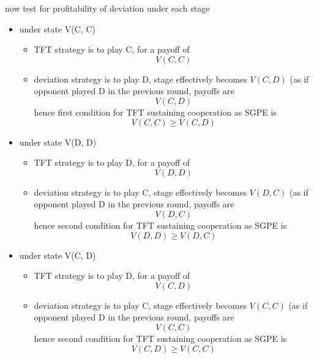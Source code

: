 \documentclass[a4paper, 10pt]{article}
\begin{document}
now test for profitability of deviation under each stage
\begin{itemize}
   \item under state V(C, C)
      \begin{itemize}
         \item TFT strategy is to play C, for a payoff of 
            \[
               V(C, C)
            \]
            
         \item deviation strategy is to play D, stage effectively becomes $V(C, D)$  (as if opponent played D in the previous round, payoffs are
            \[
               V(C, D)
            \]
         hence first condition for TFT sustaining cooperation as SGPE is 
         \begin{equation}
            V(C, C) \ge V(C, D)
         \end{equation}	
            
      \end{itemize}	

   \item under state V(D, D)
      \begin{itemize}
         \item TFT strategy is to play D, for a payoff of 
            \[
               V(D, D)
            \]
            
         \item deviation strategy is to play C, stage effectively becomes $V(D, C)$  (as if opponent played D in the previous round, payoffs are
            \[
               V(D, C)
            \]
         hence second condition for TFT sustaining cooperation as SGPE is 
         \begin{equation}
            V(D, D) \ge V(D, C)
         \end{equation}	
            
      \end{itemize}	

   \item under state V(C, D)
      \begin{itemize}
         \item TFT strategy is to play D, for a payoff of 
            \[
               V(C, D)
            \]
            
         \item deviation strategy is to play C, stage effectively becomes $V(C, C)$  (as if opponent played D in the previous round, payoffs are
            \[
               V(C, C)
            \]
         hence second condition for TFT sustaining cooperation as SGPE is 
         \begin{equation}
            V(C, D) \ge V(C, C)
         \end{equation}	
            

\end{itemize}
\end{itemize}
\end{document}
